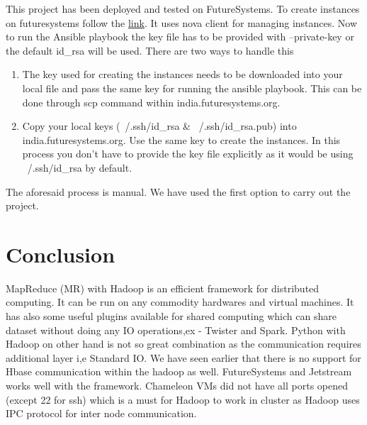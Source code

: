 \documentclass[9pt,twocolumn,twoside]{../../styles/osajnl}
\begin{document}
This project has been deployed and tested on FutureSystems. To create instances on futuresystems follow the \href{https://cloudmesh.github.io/classes/lesson/cloud/futuresystems.html}{link}. It uses nova client for managing instances. Now to run the Ansible playbook the key file has to be provided with --private-key or the default id\_rsa will be used. There are two ways to handle this \newline

\begin{enumerate}
\item The key used for creating the instances needs to be downloaded into your local file and pass the same key for running the ansible playbook. This can be done through scp command within india.futuresystems.org.
\item Copy your local keys (~/.ssh/id\_rsa \& ~/.ssh/id\_rsa.pub) into india.futuresystems.org. Use the same key to create the instances. In this process you don't have to provide the key file explicitly as it would be using ~/.ssh/id\_rsa by default.
\end{enumerate}
The aforesaid process is manual. We have used the first option to carry out the project.

\section{Conclusion}
MapReduce (MR) with Hadoop is an efficient framework for distributed computing. It can be run on any commodity hardwares and virtual machines. It has also some useful plugins available for shared computing which can share dataset without doing any IO operations,ex - Twister and Spark. Python with Hadoop on other hand is not so great combination as the communication requires additional layer i,e Standard IO. We have seen earlier that there is no support for Hbase communication within the hadoop as well. FutureSystems and Jetstream works well with the framework. Chameleon VMs did not have all ports opened (except 22 for ssh) which is a must for Hadoop to work in cluster as Hadoop uses IPC protocol for inter node communication. 




 
\end{document}
